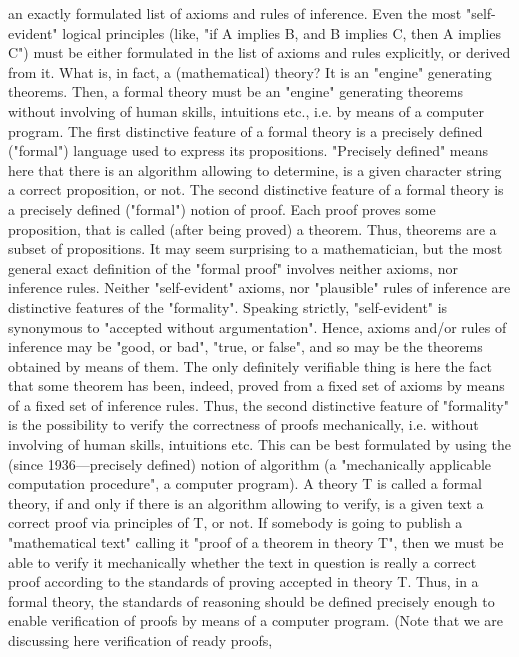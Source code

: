 an exactly formulated list of axioms and rules of inference. Even the most "self-evident" logical
principles (like, "if A implies B, and B implies C, then A implies C") must be either formulated in the list
of axioms and rules explicitly, or derived from it.
What is, in fact, a (mathematical) theory? It is an "engine" generating theorems. Then, a formal theory
must be an "engine" generating theorems without involving of human skills, intuitions etc., i.e. by means
of a computer program.
The first distinctive feature of a formal theory is a precisely defined ("formal") language used to express
its propositions. "Precisely defined" means here that there is an algorithm allowing to determine, is a
given character string a correct proposition, or not.
The second distinctive feature of a formal theory is a precisely defined ("formal") notion of proof. Each
proof proves some proposition, that is called (after being proved) a theorem. Thus, theorems are a subset
of propositions.
It may seem surprising to a mathematician, but the most general exact definition of the "formal proof"
involves neither axioms, nor inference rules. Neither "self-evident" axioms, nor "plausible" rules of
inference are distinctive features of the "formality". Speaking strictly, "self-evident" is synonymous to
"accepted without argumentation". Hence, axioms and/or rules of inference may be "good, or bad", "true,
or false", and so may be the theorems obtained by means of them. The only definitely verifiable thing is
here the fact that some theorem has been, indeed, proved from a fixed set of axioms by means of a fixed
set of inference rules.
Thus, the second distinctive feature of "formality" is the possibility to verify the correctness of proofs
mechanically, i.e. without involving of human skills, intuitions etc. This can be best formulated by using
the (since 1936---precisely defined) notion of algorithm (a "mechanically applicable computation
procedure", a computer program).
A theory T is called a formal theory, if and only if there is an algorithm allowing to verify, is a given
text a correct proof via principles of T, or not. If somebody is going to publish a "mathematical text"
calling it "proof of a theorem in theory T", then we must be able to verify it mechanically whether the text
in question is really a correct proof according to the standards of proving accepted in theory T. Thus, in a
formal theory, the standards of reasoning should be defined precisely enough to enable verification of
proofs by means of a computer program. (Note that we are discussing here verification of ready proofs,
